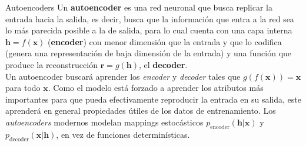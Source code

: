 \documentclass[handout, 9pt]{beamer}
\begin{document}
\begin{frame}{Autoencoders}
Un \textbf{autoencoder} es una red neuronal que busca replicar la entrada hacia la salida, es decir, busca que la información que entra a la red sea lo más parecida posible a la de salida, para lo cual cuenta con una capa interna $\bm{h} = f(\bm{x})$ (\textbf{encoder}) con menor dimensión que la entrada y que lo codifica (genera una representación de baja dimensión de la entrada) y una función que produce la reconstrucción $\bm{r} = g(\bm{h})$, el \textbf{decoder}. \pause \\

Un autoencoder buscará aprender los \textit{encoder} y \textit{decoder} tales que $g(f(\bm{x})) = \bm{x}$ para todo $\bm{x}$. Como el modelo está forzado a aprender los atributos más importantes para que pueda efectivamente reproducir la entrada en su salida, este aprenderá en general propiedades útiles de los datos de entrenamiento. Los \textit{autoencoders} modernos modelan mappings estocásticos $p_{\textrm{encoder}}(\bm{h}|\bm{x})$ y $p_{\textrm{decoder}}(\bm{x}|\bm{h})$, en vez de funciones determinísticas. \pause

\begin{figure}[H]
\captionsetup{font=small,labelfont=small}
\centering
{}
\end{figure}

\end{frame}
\end{document}
